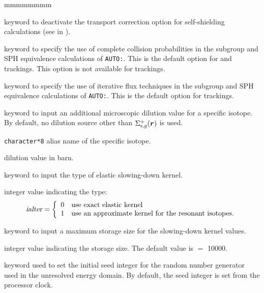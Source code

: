 \begin{ListeDeDescription}{mmmmmmmm}
\item[\moc{NOTR}] keyword to deactivate the transport correction option for
self-shielding calculations (see  in ).

\item[\moc{PIJ}] keyword to specify the use of complete collision
probabilities in the subgroup and SPH equivalence calculations of {\tt AUTO:}.
This is the default option for  and  trackings.
This option is not available for  trackings.

\item[\moc{ARM}] keyword to specify the use of iterative flux techniques
in the subgroup and SPH equivalence calculations of {\tt AUTO:}.
This is the default option for  trackings.

\item[\moc{DILU}]  keyword to input an additional microscopic dilution value for a specific isotope. By default, no dilution
source other than $\Sigma_{{\rm s},g}^+(\bff(r))$ is used.

\item[\dusa{isot\_d}] {\tt character*8} alias name of the specific isotope.

\item[\dusa{dilut}] dilution value in barn.

\item[\moc{KERN}]  keyword to input the type of elastic slowing-down kernel.

\item[\dusa{ialter}] integer value indicating the type:
$$
\textsl{ialter} = \left\{
\begin{array}{ll}
0 & \textrm{use exact elastic kernel} \\
1 & \textrm{use an approximate kernel for the resonant isotopes.}
\end{array} \right.
$$

\item[\moc{MAXT}]  keyword to input a maximum storage size for the slowing-down kernel values.

\item[\dusa{maxtra}] integer value indicating the storage size. The default value is  $=$ 10000.

\item[\moc{SEED}] keyword used to set the initial seed integer for the random number generator used in
the unresolved energy domain. By default, the seed integer is set from the processor clock.


\end{ListeDeDescription}
